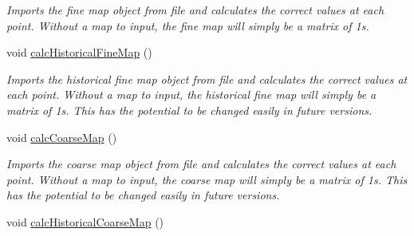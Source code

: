 \begin{DoxyCompactItemize}
\begin{DoxyCompactList}\small\item\em Imports the fine map object from file and calculates the correct values at each point. Without a map to input, the fine map will simply be a matrix of 1s. \end{DoxyCompactList}\item 
void \hyperlink{class_landscape_aa1861f8971b5dad0904284f8d873da3a}{calc\+Historical\+Fine\+Map} ()\hypertarget{class_landscape_aa1861f8971b5dad0904284f8d873da3a}{}\label{class_landscape_aa1861f8971b5dad0904284f8d873da3a}

\begin{DoxyCompactList}\small\item\em Imports the historical fine map object from file and calculates the correct values at each point. Without a map to input, the historical fine map will simply be a matrix of 1s. This has the potential to be changed easily in future versions. \end{DoxyCompactList}\item 
void \hyperlink{class_landscape_a2b34dcd828e0006dde9e60315cbddac8}{calc\+Coarse\+Map} ()\hypertarget{class_landscape_a2b34dcd828e0006dde9e60315cbddac8}{}\label{class_landscape_a2b34dcd828e0006dde9e60315cbddac8}

\begin{DoxyCompactList}\small\item\em Imports the coarse map object from file and calculates the correct values at each point. Without a map to input, the coarse map will simply be a matrix of 1s. This has the potential to be changed easily in future versions. \end{DoxyCompactList}\item 
void \hyperlink{class_landscape_a2ac3d30b203ecb73d0b2a126a4ed8acf}{calc\+Historical\+Coarse\+Map} ()\hypertarget{class_landscape_a2ac3d30b203ecb73d0b2a126a4ed8acf}{}\label{class_landscape_a2ac3d30b203ecb73d0b2a126a4ed8acf}


\end{DoxyCompactItemize}

